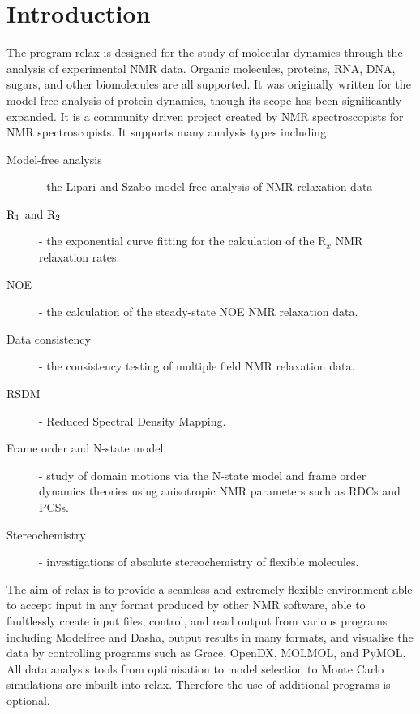
\chapter{Introduction}

The program relax is designed for the study of molecular dynamics through the analysis of experimental NMR data. Organic molecules, proteins, RNA, DNA, sugars, and other biomolecules are all supported. It was originally written for the model-free analysis of protein dynamics, though its scope has been significantly expanded.  It is a community driven project created by NMR spectroscopists for NMR spectroscopists.  It supports many analysis types including:

\begin{description}
\item[Model-free analysis] - the Lipari and Szabo model-free analysis of NMR relaxation data
\item[$\mathrm{R}_1$ and $\mathrm{R}_2$] - the exponential curve fitting for the calculation of the R$_x$ NMR relaxation rates.
\item[NOE] - the calculation of the steady-state NOE NMR relaxation data.
\item[Data consistency] - the consistency testing of multiple field NMR relaxation data.
\item[RSDM] - Reduced Spectral Density Mapping.
\item[Frame order and N-state model] - study of domain motions via the N-state model and frame order dynamics theories using anisotropic NMR parameters such as RDCs and PCSs.
\item[Stereochemistry] - investigations of absolute stereochemistry of flexible molecules.
\end{description}

The aim of relax is to provide a seamless and extremely flexible environment able to accept input in any format produced by other NMR software, able to faultlessly create input files, control, and read output from various programs including Modelfree and Dasha, output results in many formats, and visualise the data by controlling programs such as Grace, OpenDX, MOLMOL, and PyMOL.  All data analysis tools from optimisation to model selection to Monte Carlo simulations are inbuilt into relax. Therefore the use of additional programs is optional.

